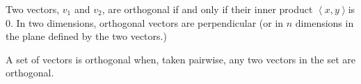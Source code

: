 \documentclass{article}
\begin{document}
Two vectors, $v_1$ and $v_2$, are orthogonal if and only if their inner product $\left<x,y\right>$is 0.  In two dimensions, orthogonal vectors are perpendicular (or in $n$ dimensions in the plane defined by the two vectors.)

A set of vectors is orthogonal when, taken pairwise, any two vectors in the set are orthogonal.
\end{document}
